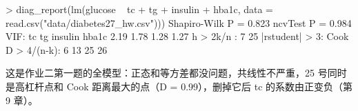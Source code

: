 \begin{routput}
> diag_report(lm(glucose ~ tc + tg + insulin + hba1c, data = read.csv("data/diabetes27_hw.csv")))
Shapiro-Wilk P = 0.823
ncvTest P      = 0.984
VIF:
     tc      tg insulin   hba1c
   2.19    1.78    1.28    1.27
h > 2k/n      : 7 25
|rstudent| > 3:
Cook D > 4/(n-k): 6 13 25 26
\end{routput}
这是作业二第一题的全模型：正态和等方差都没问题，共线性不严重，25 号同时是高杠杆点和 Cook 距离最大的点（D = 0.99），删掉它后 tc 的系数由正变负（第 9 章）。
